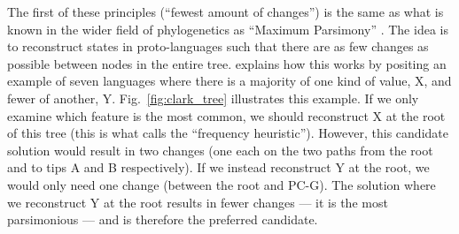 \documentclass[12pt,letterpaper]{article}
\begin{document}


The first of these principles (``fewest amount of changes'') is the same as what is known in the wider field of phylogenetics as ``Maximum Parsimony'' \citep{felsenstein2004inferring}. The idea is to reconstruct states in proto-languages such that there are as few changes as possible between nodes in the entire tree. \citet[17-22]{clark1973aspects} explains how this works by positing an example of seven languages where there is a majority of one kind of value, X, and fewer of another, Y. Fig.~\ref{fig:clark_tree} illustrates this example. If we only examine which feature is the most common, we should reconstruct X at the root of this tree (this is what \cite{goldstein_2022} calls the ``frequency heuristic''). However, this candidate solution would result in two changes (one each on the two paths from the root and to tips A and B respectively). If we instead reconstruct Y at the root, we would only need one change (between the root and PC-G). The solution where we reconstruct Y at the root results in fewer changes --- it is the most parsimonious --- and is therefore the preferred candidate.
 
\end{document}
